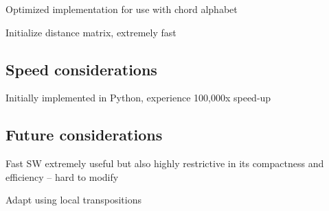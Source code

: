 \item Optimized implementation for use with chord alphabet

\item Initialize distance matrix, extremely fast

\subsection{Speed considerations}

\item Initially implemented in Python, experience 100,000x speed-up

\subsection{Future considerations}

\item Fast SW extremely useful but also highly restrictive in its compactness and efficiency -- hard to modify

\item Adapt using local transpositions